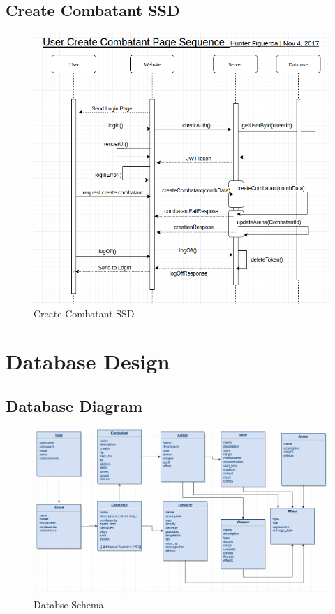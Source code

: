 \documentclass[12pt,a4paper]{report}
\begin{document}
	\newpage
	\subsection {Create Combatant SSD}
	\begin{figure}[H]
		\centering
		\centerline{\includegraphics[scale=.7, angle=90]{ssd_combatant}}
		\caption{Create Combatant SSD}
		\label{fig: Create Combatant SSD }
	\end{figure}
	

\newpage
\section{Database Design}
\subsection {Database Diagram}
\begin{figure}[H]
	\centering
	\includegraphics[scale=.6, angle= 90]{database_schema}
	\caption{Databse Schema}
	\label{fig: Databse Schema }
\end{figure}
\end{document}
